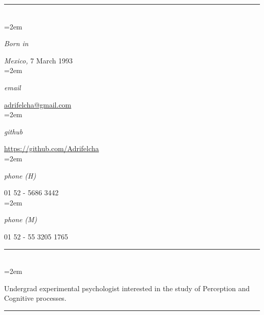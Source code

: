 \documentclass{scrartcl}
\newlength{\datebox}\settowidth{\datebox}{September 2017} %
\newcommand{\NewEntry}[3]{\noindent\hangindent=2em\hangafter=0 \parbox{\datebox}{\small \textit{#1}}\hspace{1.5em} #2 #3 %
\vspace{0.5em}} %
\newcommand{\Description}[1]{\hangindent=2em\hangafter=0\noindent\raggedright\footnotesize{#1}\par\normalsize\vspace{1em}} %
\begin{document}
\thispagestyle{empty} %


\begin{cv}{\textbf{}}\vspace{1.5em} %

\hrule{}\vspace{1.5em}

\noindent{}\vspace{0.1em}\\ %

\NewEntry{Born in}{\textit{Mexico,}}{7 March 1993}\\ %
\NewEntry{email}{\href{mailto:adrifelcha@gmail.com}{adrifelcha@gmail.com}}\\ %
\NewEntry{github}{\href{https://github.com/Adrifelcha}{https://github.com/Adrifelcha}}\\ %
\NewEntry{phone (H)}{01 52 - 5686 3442}\\ %
\NewEntry{phone (M)}{01 52 - 55 3205 1765}\\%

\hrule{}\vspace{1.5em}

\noindent{}\vspace{0.1em}\\ %

\Description{Undergrad experimental psychologist interested in the study of Perception and Cognitive processes.}\vspace{1em} %

\hrule{}\vspace{1.5em}




\end{cv}
\end{document}
